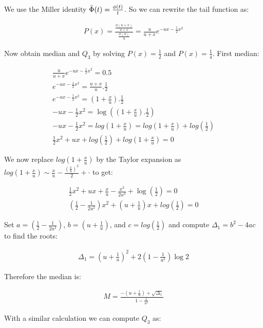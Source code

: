 \documentclass{article}
\begin{document}
We use the Miller identity $\Bar \Phi(t) = \frac{\phi(t)}{t}$. So we can rewrite the tail function as:

\begin{align}
    P(x) = \frac{ \frac{\phi(u+x)}{u+x} }{ \frac{\phi(u)}{u} } = \frac{u}{u+x} e^{-ux - \frac{1}{2} x^2 }
\end{align}

Now obtain median and $Q_3$ by solving $P(x)=\frac{1}{2}$ and $P(x) = \frac{1}{4}$. First median:

\begin{align}
\frac{u}{u+x} e^{-ux - \frac{1}{2} x^2 } = 0.5 \\
e^{-ux - \frac{1}{2} x^2 } = \frac{u+x}{u} . \frac{1}{2} \\
e^{-ux - \frac{1}{2} x^2 } = (1 + \frac{x}{u}) . \frac{1}{2} \\
-ux - \frac{1}{2} x^2 = \log((1 + \frac{x}{u}) . \frac{1}{2}) \\
-ux - \frac{1}{2} x^2 = log(1 + \frac{x}{u}) = log(1 + \frac{x}{u}) + log(\frac{1}{2}) \\
\frac{1}{2} x^{2} + ux + log(\frac{1}{2}) + log(1 + \frac{x}{u}) = 0
\end{align}

We now replace $log(1 + \frac{x}{u})$ by the Taylor expansion as $log(1 + \frac{x}{u}) \sim \frac{x}{u} - \frac{ (\frac{x}{u})^2 }{2} + \cdot$ to get:

\begin{align}
\frac{1}{2} x^{2} + ux + \frac{x}{u} - \frac{x^2}{2u^2} + \log(\frac{1}{2}) = 0 \\
\left( \frac{1}{2} - \frac{1}{2u^2} \right) x^2 + \left( u + \frac{1}{u} \right) x + log(\frac{1}{2}) = 0
\end{align}

Set $a = \left( \frac{1}{2} - \frac{1}{2u^2} \right)$, $b = \left( u + \frac{1}{u} \right)$, and $c = log(\frac{1}{2})$ and compute $\Delta_1 = b^2  - 4ac$ to find the roots:

\begin{align}
    \Delta_{1} = \left( u + \frac{1}{u} \right)^{2} + 2 \left( 1 - \frac{1}{u^2} \right) \log{2}
\end{align}

Therefore the median is:

\begin{align}
    M = \frac{-(u+\frac{1}{u}) + \sqrt{\Delta_1}}{1 - \frac{1}{u^2}}
\end{align}

With a similar calculation we can compute $Q_3$ as:
\end{document}

